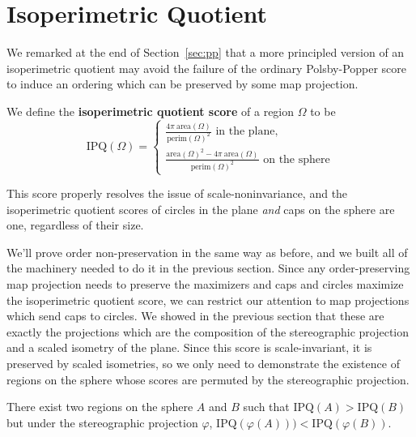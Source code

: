 \section{Isoperimetric Quotient}\label{sec:isoper}


We remarked at the end of Section~\ref{sec:pp} that a more principled version of an isoperimetric quotient may avoid the failure of the ordinary Polsby-Popper score to induce an ordering which can be preserved by some map projection.

\begin{definition}
We define the \textbf{isoperimetric quotient score} of a region $\Omega$ to be$$
\mathrm{IPQ}(\Omega)=
\begin{cases}
\frac{4\pi \ \mathrm{area}(\Omega)}{\mathrm{perim}(\Omega)^2} \text{ in the plane},\\[10pt]
\frac{\mathrm{area}(\Omega)^2 - 4\pi \ \mathrm{area}(\Omega)}{\mathrm{perim}(\Omega)^2}\text{ on the sphere}
\end{cases}
$$
\end{definition}

This score properly resolves the issue of scale-noninvariance, and the isoperimetric quotient scores of circles in the plane \textit{and} caps on the sphere are one, regardless of their size.

We'll prove order non-preservation in the same way as before, and we built all of the machinery needed to do it in the previous section.  Since any order-preserving map projection needs to preserve the maximizers and caps and circles maximize the isoperimetric quotient score, we can restrict our attention to map projections which send caps to circles.  We showed in the previous section that these are exactly the projections which are the composition of the stereographic projection and a scaled isometry of the plane.  Since this score is scale-invariant, it is preserved by scaled isometries, so we only need to demonstrate the existence of regions on the sphere whose scores are permuted by the stereographic projection.


\begin{theorem}
There exist two regions on the sphere $A$ and $B$ such that $\mathrm{IPQ}(A)>\mathrm{IPQ}(B)$ but under the stereographic projection $\varphi$, $\mathrm{IPQ}(\varphi(A)))<\mathrm{IPQ}(\varphi(B))$.
\end{theorem}

